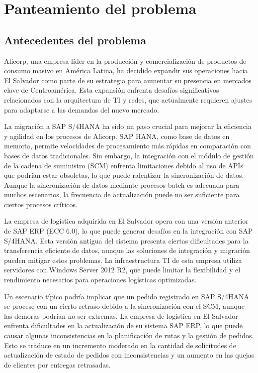 \section{Panteamiento del problema}
\subsection{Antecedentes del problema}

Alicorp, una empresa líder en la producción y comercialización de productos de consumo masivo en América Latina, ha decidido expandir sus operaciones hacia El Salvador como parte de su estrategia para aumentar su presencia en mercados clave de Centroamérica. Esta expansión enfrenta desafíos significativos relacionados con la arquitectura de TI y redes, que actualmente requieren ajustes para adaptarse a las demandas del nuevo mercado.

La migración a SAP S/4HANA ha sido un paso crucial para mejorar la eficiencia y agilidad en los procesos de Alicorp. SAP HANA, como base de datos en memoria, permite velocidades de procesamiento más rápidas en comparación con bases de datos tradicionales. Sin embargo, la integración con el módulo de gestión de la cadena de suministro (SCM) enfrenta limitaciones debido al uso de APIs que podrían estar obsoletas, lo que puede ralentizar la sincronización de datos. Aunque la sincronización de datos mediante procesos batch es adecuada para muchos escenarios, la frecuencia de actualización puede no ser suficiente para ciertos procesos críticos.

La empresa de logística adquirida en El Salvador opera con una versión anterior de SAP ERP (ECC 6.0), lo que puede generar desafíos en la integración con SAP S/4HANA. Esta versión antigua del sistema presenta ciertas dificultades para la transferencia eficiente de datos, aunque las soluciones de integración y migración pueden mitigar estos problemas. La infraestructura TI de esta empresa utiliza servidores con Windows Server 2012 R2, que puede limitar la flexibilidad y el rendimiento necesarios para operaciones logísticas optimizadas.

Un escenario típico podría implicar que un pedido registrado en SAP S/4HANA se procese con un cierto retraso debido a la sincronización con el SCM, aunque las demoras podrían no ser extremas. La empresa de logística en El Salvador enfrenta dificultades en la actualización de su sistema SAP ERP, lo que puede causar algunas inconsistencias en la planificación de rutas y la gestión de pedidos. Esto se traduce en un incremento moderado en la cantidad de solicitudes de actualización de estado de pedidos con inconsistencias y un aumento en las quejas de clientes por entregas retrasadas.

